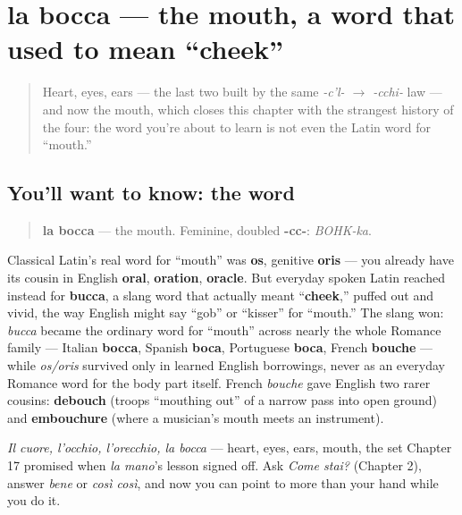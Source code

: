 \section[la bocca]{la bocca — the mouth, a word that used to mean \textquotedblleft{}cheek\textquotedblright{}}

\label{lesson:IT-C24-bocca}



\begin{quote}
Heart, eyes, ears — the last two built by the same \emph{-c'l- $\to$ -cchi-} law — and now the mouth, which closes this chapter with the strangest history of the four: the word you're about to learn is not even the Latin word for \textquotedblleft{}mouth.\textquotedblright{}
\end{quote}

\subsection*{You'll want to know: the word}
\begin{quote}
\textbf{la bocca} — the mouth. Feminine, doubled \textbf{-cc-}: \emph{BOHK-ka}.
\end{quote}

\begin{cousinweb}
Classical Latin's real word for \textquotedblleft{}mouth\textquotedblright{} was \textbf{os}, genitive \textbf{oris} — you already have its cousin in English \textbf{oral}, \textbf{oration}, \textbf{oracle}. But everyday spoken Latin reached instead for \textbf{bucca}, a slang word that actually meant \textquotedblleft{}\textbf{cheek},\textquotedblright{} puffed out and vivid, the way English might say \textquotedblleft{}gob\textquotedblright{} or \textquotedblleft{}kisser\textquotedblright{} for \textquotedblleft{}mouth.\textquotedblright{} The slang won: \emph{bucca} became the ordinary word for \textquotedblleft{}mouth\textquotedblright{} across nearly the whole Romance family — Italian \textbf{bocca}, Spanish \textbf{boca}, Portuguese \textbf{boca}, French \textbf{bouche} — while \emph{os/oris} survived only in learned English borrowings, never as an everyday Romance word for the body part itself. French \emph{bouche} gave English two rarer cousins: \textbf{debouch} (troops \textquotedblleft{}mouthing out\textquotedblright{} of a narrow pass into open ground) and \textbf{embouchure} (where a musician's mouth meets an instrument).
\end{cousinweb}

\begin{grammarlens}[title={What you've built this chapter}]
\emph{Il cuore, l'occhio, l'orecchio, la bocca} — heart, eyes, ears, mouth, the set Chapter 17 promised when \emph{la mano}'s lesson signed off. Ask \emph{Come stai?} (Chapter 2), answer \emph{bene} or \emph{così così}, and now you can point to more than your hand while you do it.
\end{grammarlens}

